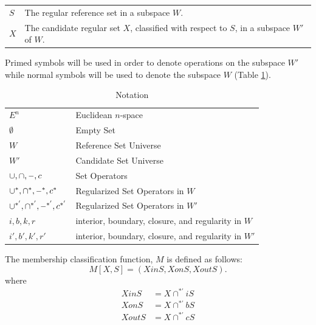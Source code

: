 \documentclass[a4paper,11pt,oneside]{article}
\makeatletter
\newcommand{\minus}{\scalebox{0.9}[1.0]{$-$}} %
\newenvironment{conditions}
  {\par\vspace{\abovedisplayskip}\noindent\begin{tabular}{>{$}l<{$} @{${}={}$} l}}
  {\end{tabular}\par\vspace{\belowdisplayskip}}
\makeatother
\begin{document}
\begin{conditions}
	S     &  The regular reference set in a subspace $W$. \\
	X     &  The candidate regular set $X$, classified with respect to $S$, in a subspace $W'$ of $W$. \\
\end{conditions}

Primed symbols will be used	in order to denote operations on the subspace $W'$ while normal symbols will be used to denote the subspace $W$ (Table \ref{table:notations}).
 
\begin{table}
	\caption{Notation}
	\label{table:notations}
	\begin{tabularx}{\textwidth}{p{}X}
		\toprule
		$E^n$                                       & Euclidean $n$-space                                 \\
		$\emptyset$                                 & Empty Set                                           \\
		$W$                                         & Reference Set Universe                              \\
		$W'$                                        & Candidate Set Universe                              \\
		$\cup, \cap, \minus, c$                     & Set Operators                                       \\
		$\cup^*, \cap^*, \minus^*, c^*$             & Regularized Set Operators in $W$                    \\
		$\cup^{*'}, \cap^{*'}, \minus^{*'}, c^{*'}$ & Regularized Set Operators in $W'$                   \\
		$i, b, k, r$                                & interior, boundary, closure, and regularity in $W$  \\
		$i', b', k', r'$                            & interior, boundary, closure, and regularity in $W'$ \\
		\bottomrule
	\end{tabularx}
\end{table}

\begin{definition}
	The membership classification function, $M$ is defined as follows:
	\begin{equation}
		M[X, S] = (XinS, XonS, XoutS).
	\end{equation}
	where
	\begin{align*}
		XinS  & = X \cap^{*'} iS \\
		XonS  & = X \cap^{*'} bS \\
		XoutS & = X \cap^{*'} cS 
	\end{align*}
\end{definition}
\end{document}

